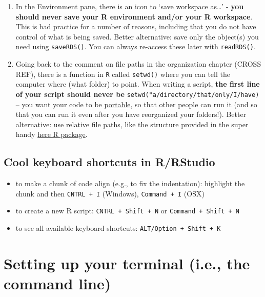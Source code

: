 \documentclass[
]{book}
\begin{document}
\begin{enumerate}
\def\labelenumi{\arabic{enumi}.}
\item
  In the Environment pane, there is an icon to `save workspace as\ldots{}' - \textbf{you should never save your R environment and/or your R workspace}. This is bad practice for a number of reasons, including that you do not have control of what is being saved. Better alternative: save only the object(s) you need using \texttt{saveRDS()}. You can always re-access these later with \texttt{readRDS()}.
\item
  Going back to the comment on file paths in the organization chapter (CROSS REF), there is a function in \texttt{R} called \texttt{setwd()} where you can tell the computer where (what folder) to point. When writing a script, \textbf{the first line of your script should never be} \texttt{setwd("a/directory/that/only/I/have)} -- you want your code to be \href{https://www.techtarget.com/searchstorage/definition/portability\#:~:text=Source\%20code\%20portability\%20refers\%20to,or\%20data\%20center\%20to\%20another.}{portable}, so that other people can run it (and so that you can run it even after you have reorganized your folders!). Better alternative: use relative file paths, like the structure provided in the super handy \href{https://here.r-lib.org/}{here R package}.
\end{enumerate}

\hypertarget{cool-keyboard-shortcuts-in-rrstudio}{%
\subsection{Cool keyboard shortcuts in R/RStudio}\label{cool-keyboard-shortcuts-in-rrstudio}}

\begin{itemize}
\item
  to make a chunk of code align (e.g., to fix the indentation): highlight the chunk and then \texttt{CNTRL\ +\ I} (Windows), \texttt{Command\ +\ I} (OSX)
\item
  to create a new R script: \texttt{CNTRL\ +\ Shift\ +\ N} or \texttt{Command\ +\ Shift\ +\ N}
\item
  to see all available keyboard shortcuts: \texttt{ALT/Option\ +\ Shift\ +\ K}
\end{itemize}

\hypertarget{setting-up-your-terminal-i.e.-the-command-line}{%
\section{Setting up your terminal (i.e., the command line)}\label{setting-up-your-terminal-i.e.-the-command-line}}
\end{document}
